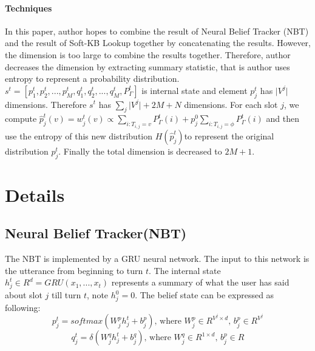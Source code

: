 \documentclass[11pt]{article}
\begin{document}
\paragraph{Techniques}
In this paper, author hopes to combine the result of Neural Belief Tracker (NBT) and the result of Soft-KB Lookup together by concatenating the results. However, the dimension is too large to combine the results together. Therefore, author decreases the dimension by extracting summary statistic, that is author uses entropy to represent a probability distribution. $s^t=[p^t_1,p^t_2,...,p^t_M,q^t_1,q^t_2,...,q^t_M,P^t_{\Gamma}]$ is internal state and element $p^t_j$ has $\vert V^j \vert$ dimensions. Therefore $s^t$ has $\sum_j \vert V^j \vert + 2M+N$ dimensions. For each slot $j$, we compute $\hat{p}^t_j(v)=w^t_j(v)\propto \sum_{i:T_{i,j}=v}P^t_{\Gamma}(i)+p^0_j\sum_{i:T_{i,j}=\phi}P^t_{\Gamma}(i)$ and then use the entropy of this new distribution $H(\hat{p}^t_j)$to represent the original distribution $p^t_j$. Finally the total dimension is decreased to $2M+1$.
\section{Details}
\subsection{Neural Belief Tracker(NBT)}
The NBT is implemented by a GRU neural network. The input to this network is the utterance from beginning to turn $t$. The internal state $h^t_j \in R^d=GRU(x_1,...,x_t)$ represents a summary of what the user has said about slot $j$ till turn $t$, note $h^0_j=0$. The belief state can be expressed as following:
\begin{equation}
p^t_j=softmax(W^p_j h^t_j +b^p_j) \mbox{, where  $W^p_j \in R^{V^j\times d}$, $b^p_j\in R^{V^j}$}
\end{equation}
\begin{equation}
q^t_j=\delta(W^q_j h^t_j +b^q_j) \mbox{, where  $W^q_j \in R^{1\times d}$, $b^p_j\in R$}
\end{equation}
\end{document}
